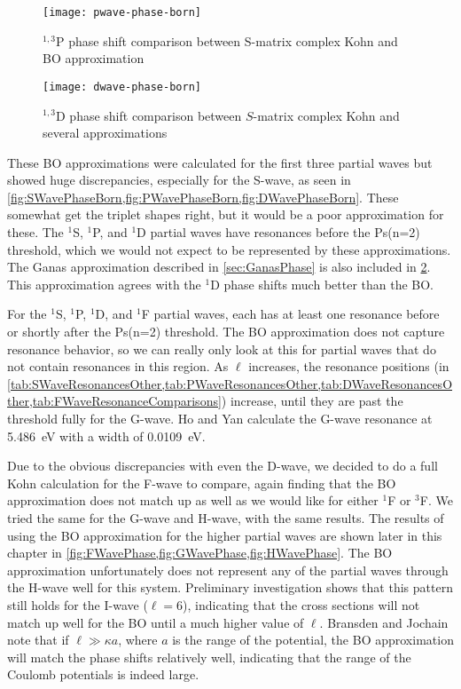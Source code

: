 \documentclass[Dissertation.tex]{subfiles}
\begin{document}
\begin{figure}
	\centering
	\texttt{[image: pwave-phase-born]}
	\caption[$^{1,3}$P complex Kohn and Born comparison]{$^{1,3}$P phase shift comparison between S-matrix complex Kohn and BO approximation}
	\label{fig:PWavePhaseBorn}
\end{figure}

\begin{figure}
	\centering
	\texttt{[image: dwave-phase-born]}
	\caption[$^{1,3}$D complex Kohn and Born comparison]{$^{1,3}$D phase shift comparison between $S$-matrix complex Kohn and several approximations}
	\label{fig:DWavePhaseBorn}
\end{figure}


These BO approximations were calculated for the first three partial waves 
but showed huge discrepancies, especially for the S-wave, as seen in
\cref{fig:SWavePhaseBorn,fig:PWavePhaseBorn,fig:DWavePhaseBorn}. These somewhat get 
the triplet shapes right, but it would be a poor approximation for these. The 
$^1$S, $^1$P, and $^1$D partial waves have resonances before the Ps(n=2)
threshold, which we would not expect to be represented by these approximations.
The Ganas approximation described in \cref{sec:GanasPhase} is also included in
\cref{fig:DWavePhaseBorn}. This approximation agrees with the $^1$D phase
shifts much better than the BO.

For the $^1$S, $^1$P, $^1$D, and $^1$F partial waves, each has at least one 
resonance before or shortly after the Ps(n=2) threshold. The BO 
approximation does not capture resonance behavior, so we can really only look 
at this for partial waves that do not contain resonances in this region. As
$\ell$ increases, the resonance positions
(in \cref{tab:SWaveResonancesOther,tab:PWaveResonancesOther,tab:DWaveResonancesOther,tab:FWaveResonanceComparisons})
increase, until they are past the threshold fully for the G-wave.
Ho and Yan \cite{Ho2000} calculate the G-wave resonance
at \SI{5.486}{eV} with a width of \SI{0.0109}{eV}.

Due to the obvious discrepancies with even the D-wave, we decided to do a 
full Kohn calculation for the F-wave to compare, again finding that the BO 
approximation does not match up as well as we would like for either
$^1$F or $^3$F. We tried the same for the G-wave and H-wave, with the same results.
The results of using the BO approximation for the higher partial waves are 
shown later in this chapter in
\cref{fig:FWavePhase,fig:GWavePhase,fig:HWavePhase}. The BO approximation 
unfortunately does not represent any of the partial waves through the H-wave 
well for this system. Preliminary investigation shows that this pattern still holds
for the I-wave ($\ell = 6$), indicating that the cross sections will not match
up well for the BO until a much higher value of $\ell$. Bransden and
Jochain \cite[p.590]{Bransden2003} note that if $\ell \gg \kappa a$, where $a$ is
the range of the potential, the BO approximation will match the phase shifts
relatively well, indicating that the range of the Coulomb potentials is
indeed large.
\end{document}
